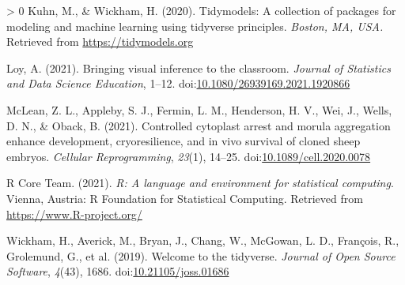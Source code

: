 \documentclass[10pt,a4paper,onecolumn]{article}
\newlength{\cslhangindent}
\newenvironment{CSLReferences}[3] %
 {%
  \setlength{\parindent}{0pt}
  \ifodd #1 \everypar{\setlength{\hangindent}{\cslhangindent}}\ignorespaces\fi
  \ifnum #2 > 0
  \setlength{\parskip}{#2\baselineskip}
  \fi
 }%
 {}
\begin{document}
\begin{CSLReferences}{1}{0}
\leavevmode\hypertarget{ref-kuhn2020tidymodels}{}%
Kuhn, M., \& Wickham, H. (2020). Tidymodels: A collection of packages
for modeling and machine learning using tidyverse principles.
\emph{Boston, MA, USA.} Retrieved from \url{https://tidymodels.org}

\leavevmode\hypertarget{ref-loy2021bringing}{}%
Loy, A. (2021). Bringing visual inference to the classroom.
\emph{Journal of Statistics and Data Science Education}, 1--12.
doi:\href{https://doi.org/10.1080/26939169.2021.1920866}{10.1080/26939169.2021.1920866}

\leavevmode\hypertarget{ref-mclean2021controlled}{}%
McLean, Z. L., Appleby, S. J., Fermin, L. M., Henderson, H. V., Wei, J.,
Wells, D. N., \& Oback, B. (2021). Controlled cytoplast arrest and
morula aggregation enhance development, cryoresilience, and in vivo
survival of cloned sheep embryos. \emph{Cellular Reprogramming},
\emph{23}(1), 14--25.
doi:\href{https://doi.org/10.1089/cell.2020.0078}{10.1089/cell.2020.0078}

\leavevmode\hypertarget{ref-CRAN}{}%
R Core Team. (2021). \emph{R: A language and environment for statistical
computing}. Vienna, Austria: R Foundation for Statistical Computing.
Retrieved from \url{https://www.R-project.org/}

\leavevmode\hypertarget{ref-wickham2019welcome}{}%
Wickham, H., Averick, M., Bryan, J., Chang, W., McGowan, L. D.,
François, R., Grolemund, G., et al. (2019). Welcome to the tidyverse.
\emph{Journal of Open Source Software}, \emph{4}(43), 1686.
doi:\href{https://doi.org/10.21105/joss.01686}{10.21105/joss.01686}

\end{CSLReferences}
\end{document}
